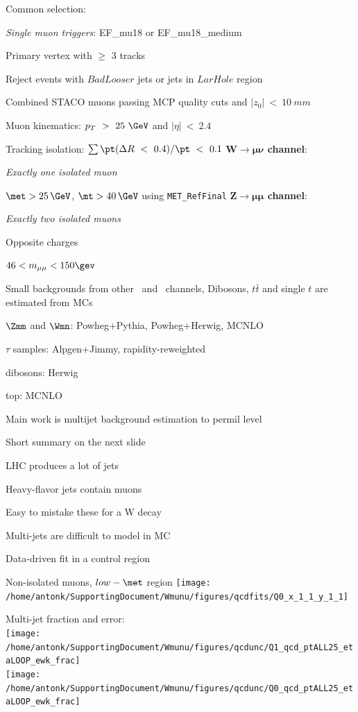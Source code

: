 {
Common selection:
\iteb
\item \textit{Single muon triggers}: EF\_mu18 or EF\_mu18\_medium
\item Primary vertex with $\ge$ 3 tracks
\item Reject events with $BadLooser$ jets or jets in $LarHole$ region
\item Combined STACO muons passing MCP quality cuts and $|z_0|~<~10~mm$
\item Muon kinematics: $p_T~>~25~\GeV$ and $|\eta|~<~2.4$
\item Tracking isolation: $\sum \pt(\Delta R~<~0.4) / \pt~<~0.1$
\itee
\textbf{\large $\mathbf{W \to \mu\nu}$ channel}:
\iteb
\item \textit{Exactly one isolated muon}
\item $\met > 25\,\GeV$, $\mt > 40\,\GeV$ using \texttt{MET\_RefFinal}
\itee
\textbf{\large $\mathbf{Z \to \mu\mu}$ channel}:
\iteb
\item \textit{Exactly two isolated muons}
\item Opposite charges
\item $46 < m_{\mu\mu} < 150\gev$
\itee
}

{
\iteb
\item Small backgrounds from other \Zll\ and \Wln\ channels, Dibosons,
  $t\bar{t}$ and single $t$ are estimated from MCs
\iteb
\item $\Zmm$ and $\Wmn$: Powheg+Pythia, Powheg+Herwig, MCNLO
\item $\tau$ samples: Alpgen+Jimmy, rapidity-reweighted
\item dibosons: Herwig
\item top: MCNLO
\itee
\item Main work is multijet background estimation to permil level
\iteb
\item Short summary on the next slide
\itee
\itee
}

{
\colb[t]
\centering
\iteb
\item LHC produces a lot of jets
\item Heavy-flavor jets contain muons
\item Easy to mistake these for a W decay
\item Multi-jets are difficult to model in MC
\iteb
\item Data-driven fit in a control region
\item Non-isolated muons, $low-\met$ region
\itee
\itee
\texttt{[image: /home/antonk/SupportingDocument/Wmunu/figures/qcdfits/Q0\_x\_1\_1\_y\_1\_1]}

\centering
\small{Multi-jet fraction and error:} \\
\texttt{[image: /home/antonk/SupportingDocument/Wmunu/figures/qcdunc/Q1\_qcd\_ptALL25\_etaLOOP\_ewk\_frac]} \\
\texttt{[image: /home/antonk/SupportingDocument/Wmunu/figures/qcdunc/Q0\_qcd\_ptALL25\_etaLOOP\_ewk\_frac]}

\cole
}

